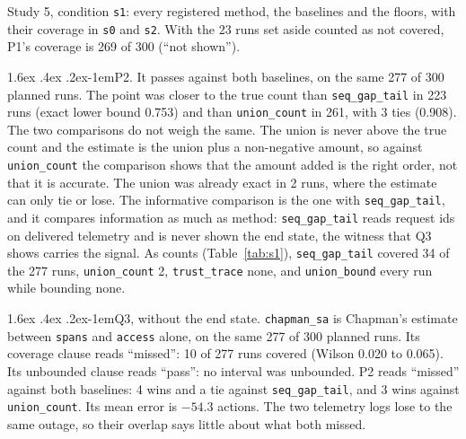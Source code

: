 \documentclass[11pt]{article}
\makeatletter
\renewcommand\paragraph{\@startsection{paragraph}{4}{\z@}%
  {1.6ex \@plus .4ex \@minus .2ex}{-1em}{\normalfont\normalsize\bfseries}}
\makeatother
\begin{document}
\begin{table}[!tb]
\centering\small

\caption{Study 5, condition \texttt{s1}: every registered method, the baselines and the
floors, with their coverage in \texttt{s0} and \texttt{s2}. With the 23 runs set aside
counted as not covered, P1's coverage is 269 of 300 (``not shown'').}
\label{tab:s1}
\end{table}

\paragraph{P2.} It passes against both baselines, on the same 277 of 300 planned runs.
The point was closer to the true count than \texttt{seq\_gap\_tail} in 223 runs (exact
lower bound 0.753) and than \texttt{union\_count} in 261, with 3 ties (0.908). The two
comparisons do not weigh the same. The union is never above the true count and the
estimate is the union plus a non-negative amount, so against \texttt{union\_count} the
comparison shows that the amount added is the right order, not that it is accurate. The
union was already exact in 2 runs, where the estimate can only tie or lose. The
informative comparison is the one with \texttt{seq\_gap\_tail}, and it compares
information as much as method: \texttt{seq\_gap\_tail} reads request ids on delivered
telemetry and is never shown the end state, the witness that Q3 shows carries the
signal. As counts (Table~\ref{tab:s1}), \texttt{seq\_gap\_tail} covered 34 of the 277
runs, \texttt{union\_count} 2, \texttt{trust\_trace} none, and \texttt{union\_bound}
every run while bounding none.

\paragraph{Q3, without the end state.} \texttt{chapman\_sa} is Chapman's estimate
between \texttt{spans} and \texttt{access} alone, on the same 277 of 300 planned runs.
Its coverage clause reads ``missed'': 10 of 277 runs covered (Wilson 0.020 to 0.065).
Its unbounded clause reads ``pass'': no interval was unbounded. P2 reads ``missed''
against both baselines: 4 wins and a tie against \texttt{seq\_gap\_tail}, and 3 wins
against \texttt{union\_count}. Its mean error is $-54.3$ actions. The two telemetry logs
lose to the same outage, so their overlap says little about what both missed.
\end{document}
